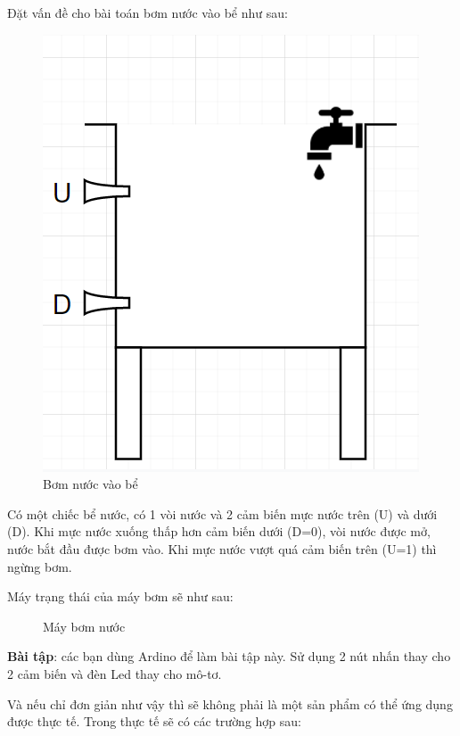 Đặt vấn đề cho bài toán bơm nước vào bể như sau:

\begin{figure}[h!]
    \centering
     \includegraphics[width=0.6\linewidth]{images/tank.png}
     \caption{Bơm nước vào bể}
\end{figure}

Có một chiếc bể nước, có 1 vòi nước và 2 cảm biến mực nước trên (U) và dưới (D). Khi mực nước xuống thấp hơn cảm biến dưới (D=0), vòi nước được mở, nước bắt đầu được bơm vào. Khi mực nước vượt quá cảm biến trên (U=1) thì ngừng bơm.

Máy trạng thái của máy bơm sẽ như sau:

\begin{figure}[h!]
	\centering
{}
\caption{Máy bơm nước}
\end{figure}

\textbf{Bài tập}: các bạn dùng Ardino để làm bài tập này. Sử dụng 2 nút nhấn thay cho 2 cảm biến và đèn Led thay cho mô-tơ.

Và nếu chỉ đơn giản như vậy thì sẽ không phải là một sản phẩm có thể ứng dụng được thực tế. Trong thực tế sẽ có các trường hợp sau:

